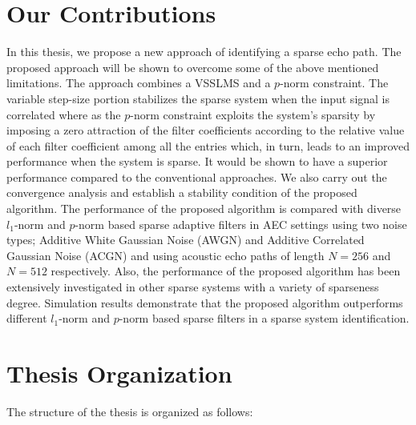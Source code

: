 \vspace{-0.3cm}
\section{Our Contributions}\label{sec:2.3}
\vspace{-0.5cm}
\noindent In this thesis, we propose a new approach of identifying a sparse echo path. The proposed approach will be shown to overcome some of the above mentioned limitations. The approach combines a VSSLMS and a $p$-norm constraint. The variable step-size portion stabilizes the sparse system when the input signal is correlated where as the $p$-norm constraint exploits the system's sparsity by imposing a zero attraction of the filter coefficients according to the relative value of each filter coefficient among all the entries which, in turn, leads to an improved performance when the system is sparse. It would be shown to have a superior performance compared to the conventional approaches. We also carry out the convergence analysis and establish a stability condition of the proposed algorithm. The performance of the proposed algorithm is compared with diverse $l_1$-norm and $p$-norm based sparse adaptive filters in AEC settings using two noise types; Additive White Gaussian Noise (AWGN) and Additive Correlated Gaussian Noise (ACGN) and using acoustic echo paths of length $N=256$ and $N=512$ respectively. Also, the performance of the proposed algorithm has been extensively investigated in other sparse systems with a variety of sparseness degree. Simulation results demonstrate that the proposed algorithm outperforms different $l_1$-norm and $p$-norm based sparse filters in a sparse system identification.

\vspace{-0.3cm}
\section{Thesis Organization}\label{sec:2.4}
\vspace{-0.5cm}
\noindent The structure of the thesis is organized as follows:

